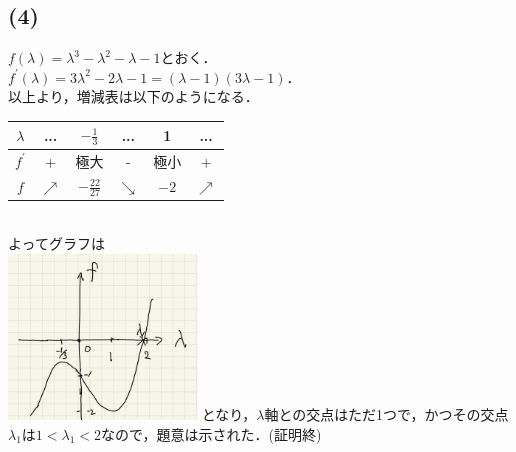 \documentclass[uplatex]{jsarticle}
\begin{document}
\subsection*{(4)}
$f(\lambda) = \lambda^3 - \lambda^2 - \lambda - 1$とおく．\\
$f^\prime(\lambda) = 3\lambda^2-2\lambda-1 = (\lambda-1)(3\lambda-1)$．\\
以上より，増減表は以下のようになる．
\begin{table}[htb]
	\begin{tabular}{|c|c c c c c|}\hline
		$\lambda$ & ... & $-\frac{1}{3}$ & ... & 1 & ... \\ \hline
		$f^\prime$ & + & 極大 & - & 極小 & + \\ \hline
		$f$ & $\nearrow$ & $-\frac{22}{27}$ & $\searrow$ & $-2$ & $\nearrow$ \\ \hline
	\end{tabular}
\end{table}
\\
よってグラフは \\
\includegraphics[width=50mm]{figure1.jpg}
となり，$\lambda$軸との交点はただ1つで，かつその交点$\lambda_1$は$1<\lambda_1<2$なので，題意は示された．(証明終)
\end{document}
